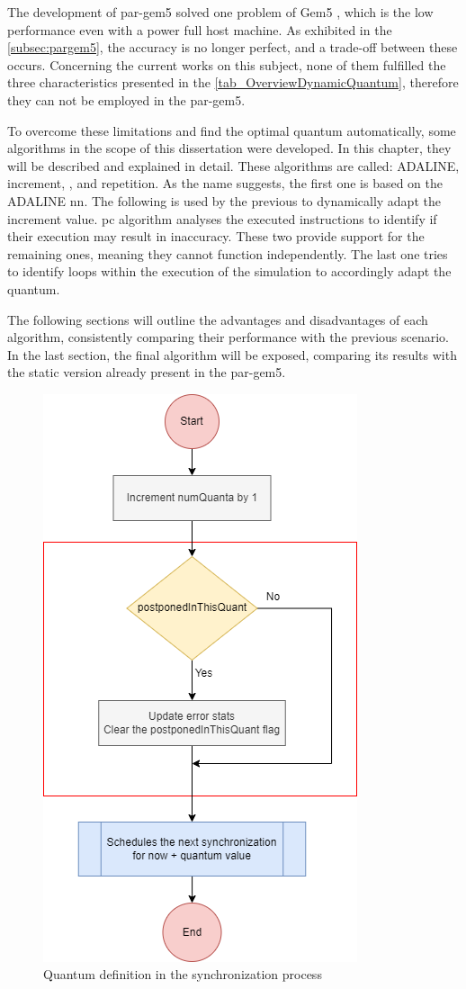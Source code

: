 
The development of par-gem5 \cite{pargem5} solved one problem of Gem5 \cite{TheGem5Simulator}, which is the low performance even with a power 
full host machine. As exhibited in the \autoref{subsec:pargem5}, the accuracy is no longer perfect, and a trade-off between these occurs. 
Concerning the current works on this subject, none of them fulfilled the three characteristics presented in the 
\autoref{tab_OverviewDynamicQuantum}, therefore they can not be employed in the par-gem5. 

To overcome these limitations and find the optimal quantum automatically, some algorithms in the scope of this dissertation were developed.  
In this chapter, they will be described and explained in detail. These algorithms are called: ADALINE, increment, , and 
repetition. As the name suggests, the first one is based on the ADALINE \gls{nn}. The following is used by the previous to dynamically adapt the 
increment value. \gls{pc} algorithm analyses the executed instructions to identify if their execution may result in inaccuracy. These two provide 
support for the remaining ones, meaning they cannot function independently. The last one tries to identify loops within the execution of the 
simulation to accordingly adapt the quantum.

The following sections will outline the advantages and disadvantages of each algorithm, consistently comparing their performance with the 
previous scenario. In the last section, the final algorithm will be exposed, comparing its results with the static version already present in the
par-gem5.

\begin{figure}[H]
	\centering
 	\includegraphics[width=0.35\linewidth]{Images/GlobalSyncEventStatic.png}
 	\caption{Quantum definition in the synchronization process}
	 \label{fig_GlobalSyncEventStatic}
\end{figure}


